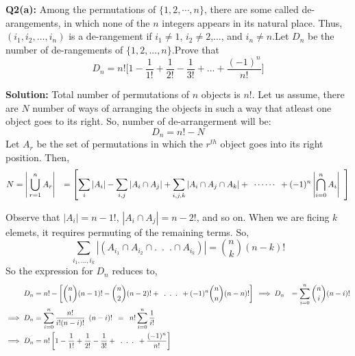 \documentclass{article}
\begin{document}
\begin{flushleft}
	    
	\textbf{Q2(a): } Among the permutations of $\{1,2,\cdots,n\}$, there are some called de-arangements, in which none of the $n$ integers appears in its natural place. Thus, $(i_{1},i_{2},...,i_{n})$ is a de-rangement if $i_1\neq 1$, $i_2\neq 2$,..., and $i_n\neq n$.Let $D_n$ be the number of de-rangements of $\{1,2,...,n\}$.Prove that
	\[D_n=n!\bigg[1-\frac{1}{1!}+\frac{1}{2!}-\frac{1}{3!}+...+\frac{(-1)^n}{n!}\bigg]\]
	    
	\newline
	\newline
	\textbf{Solution: }
	Total number of permutations of $n$ objects is $n!$.
	\newline
	Let us assume, there are $N$ number of ways of arranging the objects in such a way that atleast one object goes to its right.
	\newline
	So, number of de-arrangerment will be: \[D_{n} = n! - N\]
	\newline
	\newline
	Let $A_r$ be the set of permutations in which the $r^{th}$ object goes into its right position. Then,
	\begin{align*}
		N & =\Bigg|\bigcup_{r=1}^{n}A_r\Bigg|                                                                                                                                                                  
		\newline
		  & =\left[\sum_{i} | A_{i} |-\sum_{i,j} | A_{i} \cap A_{j} | + \sum_{i,j,k}| A_{i} \cap A_{j} \cap A_{k}| + \enspace \cdots\cdots \enspace +(-1)^n\left|\bigcap_{i=0}^{n}A_{i}\right|\enspace \right] 
	\end{align*}
	
	Observe that $|A_i|=n-1!$, $|A_i\cap A_j|=n-2!$, and so on.
	\newline
	When we are ficing $k$ elemets, it requires permuting of the remaining terms. So,
	\[\sum_{i_1,...,i_k}|(A_{i_1} \cap A_{i_2}  \cap. \enspace . \enspace .\cap A_{i_k})|=\binom{n}{k}(n-k)!\]
	So the expression for $D_n$ reduces to,
	\begin{align*}
		D_n&=n!-\left[\binom{n}{1}(n-1)!-\binom{n}{2}(n-2)!+\enspace . \enspace . \enspace . \enspace +(-1)^n \binom{n}{n}(n-n)!\right]
		\newline
		\newline
		\implies D_n & =\sum_{i=0}^{n}\binom{n}{i}(n-i)! \\\implies D_n&=\sum_{i=0}^n \dfrac{n!}{i!(n-i)!}\enspace(n-i)!\enspace=\enspace n!\sum_{i=0}^{n}\dfrac{1}{i!}\\
		\implies D_n&=n!\left[1-\dfrac{1}{1!}+\dfrac{1}{2!}-\dfrac{1}{3!}+\enspace . \enspace . \enspace . \enspace + \dfrac{(-1)^n}{n!}\right]
	\end{align*}
\end{flushleft}
\end{document}
